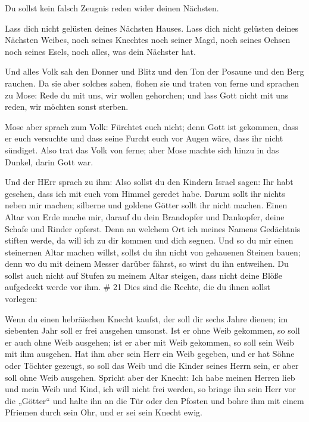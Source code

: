  Du sollst kein falsch Zeugnis reden wider deinen Nächsten.

 Lass dich nicht gelüsten deines Nächsten Hauses. Lass dich
nicht gelüsten deines Nächsten Weibes, noch seines Knechtes noch seiner
Magd, noch seines Ochsen noch seines Esels, noch alles, was dein
Nächster hat.

 Und alles Volk sah den Donner und Blitz und den Ton der
Posaune und den Berg rauchen. Da sie aber solches sahen, flohen sie und
traten von ferne  und sprachen zu Mose: Rede du mit uns,
wir wollen gehorchen; und lass Gott nicht mit uns reden, wir möchten
sonst sterben.

 Mose aber sprach zum Volk: Fürchtet euch nicht; denn Gott
ist gekommen, dass er euch versuchte und dass seine Furcht euch vor
Augen wäre, dass ihr nicht sündiget.  Also trat das Volk
von ferne; aber Mose machte sich hinzu in das Dunkel, darin Gott war.

 Und der HErr sprach zu ihm: Also sollst du den Kindern
Israel sagen: Ihr habt gesehen, dass ich mit euch vom Himmel geredet
habe.  Darum sollt ihr nichts neben mir machen; silberne
und goldene Götter sollt ihr nicht machen.  Einen Altar von
Erde mache mir, darauf du dein Brandopfer und Dankopfer, deine Schafe
und Rinder opferst. Denn an welchem Ort ich meines Namens Gedächtnis
stiften werde, da will ich zu dir kommen und dich segnen. 
Und so du mir einen steinernen Altar machen willst, sollst du ihn nicht
von gehauenen Steinen bauen; denn wo du mit deinem Messer darüber
fährst, so wirst du ihn entweihen.  Du sollst auch nicht
auf Stufen zu meinem Altar steigen, dass nicht deine Blöße aufgedeckt
werde vor ihm. \# 21  Dies sind die Rechte, die du ihnen
sollst vorlegen:

 Wenn du einen hebräischen Knecht kaufst, der soll dir sechs
Jahre dienen; im siebenten Jahr soll er frei ausgehen umsonst.
 Ist er ohne Weib gekommen, so soll er auch ohne Weib
ausgehen; ist er aber mit Weib gekommen, so soll sein Weib mit ihm
ausgehen.  Hat ihm aber sein Herr ein Weib gegeben, und er
hat Söhne oder Töchter gezeugt, so soll das Weib und die Kinder seines
Herrn sein, er aber soll ohne Weib ausgehen.  Spricht aber
der Knecht: Ich habe meinen Herren lieb und mein Weib und Kind, ich will
nicht frei werden,  so bringe ihn sein Herr vor die
„Götter`` und halte ihn an die Tür oder den Pfosten und bohre ihm mit
einem Pfriemen durch sein Ohr, und er sei sein Knecht ewig.

